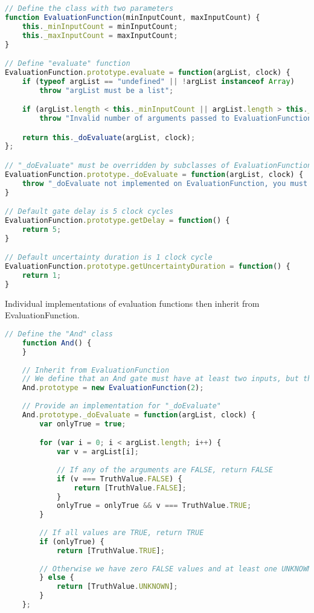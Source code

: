 \begin{lstlisting}[language=JavaScript]
// Define the class with two parameters
function EvaluationFunction(minInputCount, maxInputCount) {
    this._minInputCount = minInputCount;
    this._maxInputCount = maxInputCount;
}

// Define "evaluate" function
EvaluationFunction.prototype.evaluate = function(argList, clock) {
    if (typeof argList == "undefined" || !argList instanceof Array)
        throw "argList must be a list";

    if (argList.length < this._minInputCount || argList.length > this._maxInputCount)
        throw "Invalid number of arguments passed to EvaluationFunction";

    return this._doEvaluate(argList, clock);
};

// "_doEvaluate" must be overridden by subclasses of EvaluationFunction
EvaluationFunction.prototype._doEvaluate = function(argList, clock) {
    throw "_doEvaluate not implemented on EvaluationFunction, you must override it";
}

// Default gate delay is 5 clock cycles
EvaluationFunction.prototype.getDelay = function() {
    return 5;
}

// Default uncertainty duration is 1 clock cycle
EvaluationFunction.prototype.getUncertaintyDuration = function() {
    return 1;
}
\end{lstlisting}

Individual implementations of evaluation functions then inherit from EvaluationFunction.

\begin{lstlisting}[language=JavaScript]
	// Define the "And" class
    function And() {
    }
    
    // Inherit from EvaluationFunction
    // We define that an And gate must have at least two inputs, but there is no upper bound (we can simulate n-input AND gates)
    And.prototype = new EvaluationFunction(2);
    
    // Provide an implementation for "_doEvaluate"
    And.prototype._doEvaluate = function(argList, clock) {
        var onlyTrue = true;

        for (var i = 0; i < argList.length; i++) {
            var v = argList[i];
            
            // If any of the arguments are FALSE, return FALSE
            if (v === TruthValue.FALSE) {
                return [TruthValue.FALSE];
            }
            onlyTrue = onlyTrue && v === TruthValue.TRUE;
        }
		
		// If all values are TRUE, return TRUE
        if (onlyTrue) {
            return [TruthValue.TRUE];
        
		// Otherwise we have zero FALSE values and at least one UNKNOWN value, so the output is UNKNOWN        
        } else { 
            return [TruthValue.UNKNOWN];
        }
    };
\end{lstlisting}


